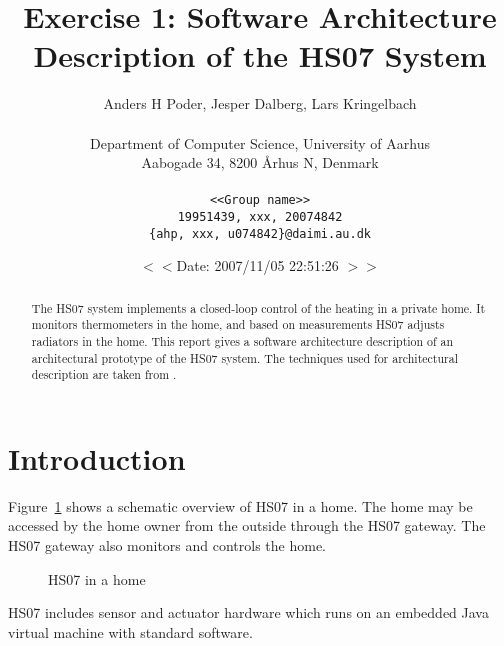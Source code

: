 \documentclass[a4paper,10pt]{article}
\begin{document}
\title{Exercise 1: Software Architecture Description of the HS07 System}

\author{
  Anders H Poder, Jesper Dalberg, Lars Kringelbach\\\\
  Department of Computer Science, University of Aarhus\\
  Aabogade 34, 8200 {\AA}rhus N, Denmark\\\\
  \makeatletter
  \texttt{<<Group name>>}\\
  \texttt{19951439, xxx, 20074842}\\
  \texttt{\{ahp, xxx, u074842\}@daimi.au.dk}
}

\date{$<<$Date: 2007/11/05 22:51:26 $>>$}

\maketitle

\begin{abstract}
  The HS07 system implements a closed-loop control of the heating in a
  private home. It monitors thermometers in the home, and based on
  measurements HS07 adjusts radiators in the home. This report gives a
  software architecture description of an architectural prototype of
  the HS07 system. The techniques used for architectural description
  are taken from \cite{christensen2004archdesc}.
\end{abstract}

\section{Introduction}

Figure~\ref{fig:hs07} shows a schematic overview of HS07 in a
home. The home may be accessed by the home owner from the outside
through the HS07 gateway. The HS07 gateway also monitors and controls
the home.
\begin{figure}[!htb]
\centerline{}
\caption{HS07 in a home}
\label{fig:hs07}
\end{figure}

HS07 includes sensor and actuator hardware which runs on an embedded Java virtual
machine with standard software.

\end{document}
